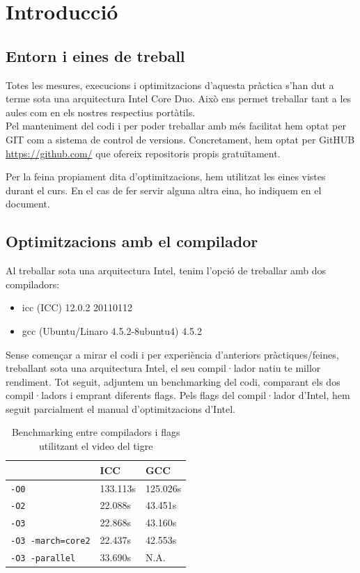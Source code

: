 \chapter{Introducci\'o}

\section{Entorn i eines de treball}
Totes les mesures, execucions i optimitzacions d'aquesta pràctica s'han dut a terme sota una arquitectura Intel Core Duo. Això ens permet treballar tant a les aules com en els nostres respectius portàtils.\\

Pel manteniment del codi i per poder treballar amb més facilitat hem optat per GIT com a sistema de control de versions. Concretament, hem optat per GitHUB \url{https://github.com/} que ofereix repositoris propis gratuïtament.

Per la feina propiament dita d'optimitzacions, hem utilitzat les eines vistes durant el curs. En el cas de fer servir alguna altra eina, ho indiquem en el document.

\section{Optimitzacions amb el compilador}
Al treballar sota una arquitectura Intel, tenim l'opció de treballar amb dos compiladors:

\begin{itemize}
  \item icc (ICC) 12.0.2 20110112
  \item gcc (Ubuntu/Linaro 4.5.2-8ubuntu4) 4.5.2
\end{itemize}

Sense començar a mirar el codi i per experiència d'anteriors pràctiques/feines, treballant sota una arquitectura Intel, el seu compil·lador natiu te millor rendiment. Tot seguit, adjuntem un benchmarking del codi, comparant els dos compil·ladors i emprant diferents flags. Pels flags del compil·lador d'Intel, hem seguit parcialment el manual d'optimitzacions d'Intel.

\begin{table}
\begin{center}
\begin{tabular}{lll}
\hline
 & ICC & GCC \\
\hline
\texttt{-O0} & 133.113s & 125.026s \\
\texttt{-O2} & 22.088s & 43.451s \\
\texttt{-O3} & 22.868s & 43.160s \\
\texttt{-O3 -march=core2} & 22.437s & 42.553s \\
\texttt{-O3 -parallel} & 33.690s & N.A.\\
\hline
\end{tabular}
\caption{Benchmarking entre compiladors i flags utilitzant el video del tigre}
\end{center}
\label{table1}
\end{table}

